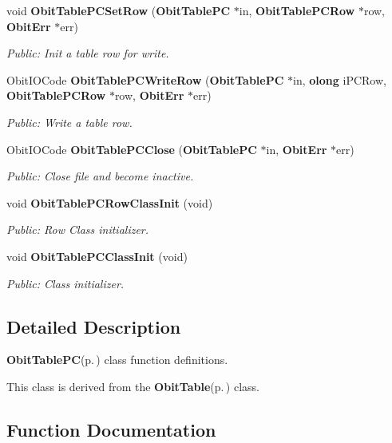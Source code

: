 \begin{CompactItemize}
void {\bf Obit\-Table\-PCSet\-Row} ({\bf Obit\-Table\-PC} $\ast$in, {\bf Obit\-Table\-PCRow} $\ast$row, {\bf Obit\-Err} $\ast$err)
\begin{CompactList}\small\item\em Public: Init a table row for write. \item\end{CompactList}\item 
Obit\-IOCode {\bf Obit\-Table\-PCWrite\-Row} ({\bf Obit\-Table\-PC} $\ast$in, {\bf olong} i\-PCRow, {\bf Obit\-Table\-PCRow} $\ast$row, {\bf Obit\-Err} $\ast$err)
\begin{CompactList}\small\item\em Public: Write a table row. \item\end{CompactList}\item 
Obit\-IOCode {\bf Obit\-Table\-PCClose} ({\bf Obit\-Table\-PC} $\ast$in, {\bf Obit\-Err} $\ast$err)
\begin{CompactList}\small\item\em Public: Close file and become inactive. \item\end{CompactList}\item 
void {\bf Obit\-Table\-PCRow\-Class\-Init} (void)
\begin{CompactList}\small\item\em Public: Row Class initializer. \item\end{CompactList}\item 
void {\bf Obit\-Table\-PCClass\-Init} (void)
\begin{CompactList}\small\item\em Public: Class initializer. \item\end{CompactList}\end{CompactItemize}


\subsection{Detailed Description}
{\bf Obit\-Table\-PC}{\rm (p.\,\pageref{structObitTablePC})} class function definitions. 

This class is derived from the {\bf Obit\-Table}{\rm (p.\,\pageref{structObitTable})} class.

\subsection{Function Documentation}
